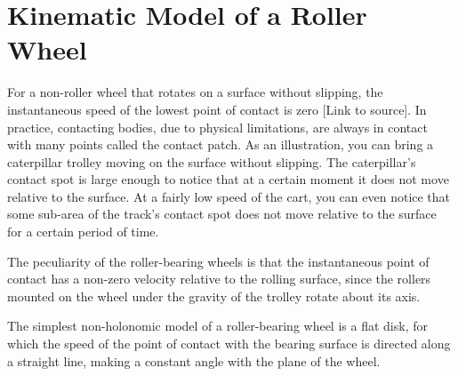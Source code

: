 \documentclass[oneside,final,14pt]{extreport}
\newcommand{\cmmnt}[1]{\ignorespaces}
\begin{document}
\iffalse
In ref, the dynamic model of a trolley with N roller-bearing wheels is considered in more detail. The trolley model is built on the assumption that the roller-bearing wheel model is a solid disk, the speed of the lowest point of which is perpendicular to the direction of the roller axis at this point. In addition, the controllability criterion of such a model is considered, from which a number of restrictions on its design follow. For example, if the sum of the angle of the roller axis and the angle of rotation of the wheel of all roller-bearing wheels is equal, then such a model cannot move along an arbitrary trajectory. If these angles of the two wheels coincide, then a pair of wheels can be taken as one virtual wheel with the radius vector $ r_{ij} = r_{i} - r_{j} $ in the local coordinate system and the moment $ T_{ij} = T_{i} + T_{j} $.
\fi
\chapter{Kinematic Model of a Roller Wheel}
For a non-roller wheel that rotates on a surface without slipping, the instantaneous speed of the lowest point of contact is zero [Link to source]. In practice, contacting bodies, due to physical limitations, are always in contact with many points called the contact patch. As an illustration, you can bring a caterpillar trolley moving on the surface without slipping. The caterpillar’s ​​contact spot is large enough to notice that at a certain moment it does not move relative to the surface. At a fairly low speed of the cart, you can even notice that some sub-area of ​​the track’s contact spot does not move relative to the surface for a certain period of time.

The peculiarity of the roller-bearing wheels is that the instantaneous point of contact has a non-zero velocity relative to the rolling surface, since the rollers mounted on the wheel under the gravity of the trolley rotate about its axis. \cmmnt{In the case of an omnidirectional wheel whose roller axes are parallel to the plane of the wheel disc, slipping does not occur, which simplifies the process of constructing a mathematical model}

 The simplest non-holonomic model of a roller-bearing wheel is a flat disk, for which the speed of the point of contact with the bearing surface is directed along a straight line, making a constant angle with the plane of the wheel.

\begin{figure} [H]
\end{figure}
\end{document}
